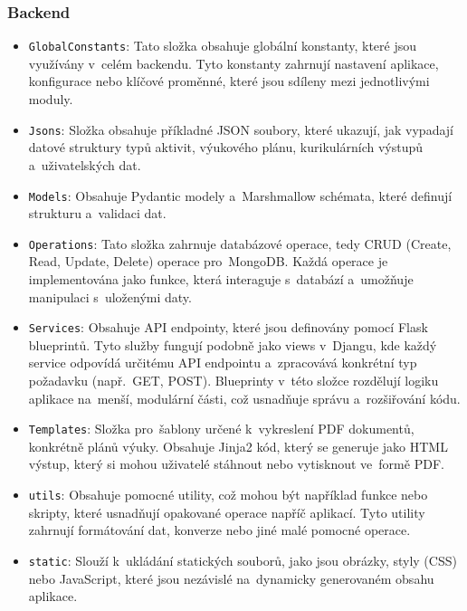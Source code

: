 \documentclass[male,czech,api_bc]{kitheses}
\begin{document}
\subsubsection{Backend}
\begin{itemize}
	\item \texttt{GlobalConstants}: Tato složka obsahuje globální konstanty, které jsou využívány v~celém backendu. Tyto konstanty zahrnují nastavení aplikace, konfigurace nebo klíčové proměnné, které jsou sdíleny mezi jednotlivými moduly.
	\item \texttt{Jsons}: Složka obsahuje příkladné JSON soubory, které ukazují, jak vypadají datové struktury typů aktivit, výukového plánu, kurikulárních výstupů a~uživatelských dat.
	\item \texttt{Models}: Obsahuje Pydantic modely a~Marshmallow schémata, které definují strukturu a~validaci dat.
	\item \texttt{Operations}: Tato složka zahrnuje databázové operace, tedy CRUD (Create, Read, Update, Delete) operace pro~MongoDB. Každá operace je implementována jako funkce, která interaguje s~databází a~umožňuje manipulaci s~uloženými daty.
	\item \texttt{Services}: Obsahuje API endpointy, které jsou definovány pomocí Flask blueprintů. Tyto služby fungují podobně jako views v~Djangu, kde každý service odpovídá určitému API endpointu a~zpracovává konkrétní typ požadavku (např.~GET, POST). Blueprinty v~této složce rozdělují logiku aplikace na~menší, modulární části, což usnadňuje správu a~rozšiřování kódu.
	\item \texttt{Templates}: Složka pro~šablony určené k~vykreslení PDF dokumentů, konkrétně plánů výuky. Obsahuje Jinja2 kód, který se generuje jako HTML výstup, který si mohou uživatelé stáhnout nebo vytisknout ve~formě PDF.
	\item \texttt{utils}: Obsahuje pomocné utility, což mohou být například funkce nebo skripty, které usnadňují opakované operace napříč aplikací. Tyto utility zahrnují formátování dat, konverze nebo jiné malé pomocné operace.
	\item \texttt{static}: Slouží k~ukládání statických souborů, jako jsou obrázky, styly (CSS) nebo JavaScript, které jsou nezávislé na~dynamicky generovaném obsahu aplikace.
\end{itemize}
\end{document}
